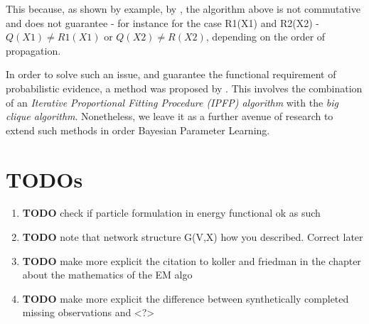 \documentclass[11pt]{article}
\begin{document}
This because, as shown by example, by \cite{PENG_2010}, the algorithm
above is not commutative and does not guarantee - for instance for
the case R1(X1) and R2(X2) - \(Q(X1) \neq R1(X1)\) or \(Q(X2) \neq
   R(X2)\), depending on the order of propagation.

In order to solve such an issue, and guarantee the functional
requirement of probabilistic evidence, a method was proposed by
\cite{PENG_2010}. This involves the combination of an \emph{Iterative
Proportional Fitting Procedure (IPFP) algorithm} with the \emph{big
clique algorithm}. Nonetheless, we leave it as a further avenue of
research to extend such methods in order Bayesian Parameter
Learning.

\newpage


\section{TODOs}
\label{sec:orgb79c35e}

\begin{enumerate}
\item {\bfseries\sffamily TODO} check if particle formulation in energy functional ok as such
\label{sec:org15ae291}

\item {\bfseries\sffamily TODO} note that network structure G(V,X) how you described. Correct later
\label{sec:orgf103f9e}

\item {\bfseries\sffamily TODO} make more explicit the citation to koller and friedman in the chapter about the mathematics of the EM algo
\label{sec:org419bfcc}

\item {\bfseries\sffamily TODO} make more explicit the difference between synthetically completed missing observations and <?>
\label{sec:org2c42e20}

\newpage



\end{enumerate}
\end{document}
